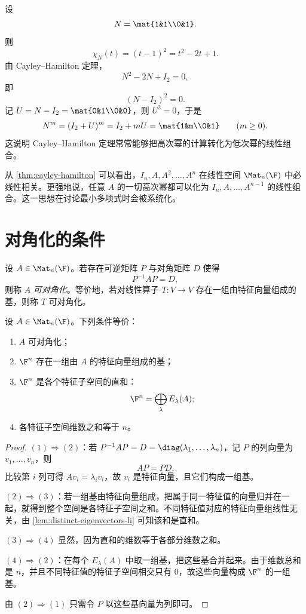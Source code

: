 \begin{example}
设
\[
N=\mat{1&1\\0&1}.
\]
则
\[
\chi_N(t)=(t-1)^2=t^2-2t+1.
\]
由 Cayley--Hamilton 定理，
\[
N^2-2N+I_2=0,
\]
即
\[
(N-I_2)^2=0.
\]
记 \(U=N-I_2=\mat{0&1\\0&0}\)，则 \(U^2=0\)，于是
\[
N^m=(I_2+U)^m=I_2+mU=\mat{1&m\\0&1}
\qquad (m\ge 0).
\]
这说明 Cayley--Hamilton 定理常常能够把高次幂的计算转化为低次幂的线性组合。
\end{example}

\begin{remark}
从 \cref{thm:cayley-hamilton} 可以看出，\(I_n,A,A^2,\dots,A^n\) 在线性空间 \(\Mat_n(\F)\) 中必线性相关。更强地说，任意 \(A\) 的一切高次幂都可以化为 \(I_n,A,\dots,A^{n-1}\) 的线性组合。这一思想在讨论最小多项式时会被系统化。
\end{remark}

\section{对角化的条件}\label{sec:diagonalization}

\begin{definition}
设 \(A\in \Mat_n(\F)\)。若存在可逆矩阵 \(P\) 与对角矩阵 \(D\) 使得
\[
P^{-1}AP=D,
\]
则称 \(A\) \emph{可对角化}。等价地，若对线性算子 \(T\colon V\to V\) 存在一组由特征向量组成的基，则称 \(T\) 可对角化。
\end{definition}

\begin{theorem}\label{thm:diag-criterion-basis}
设 \(A\in \Mat_n(\F)\)。下列条件等价：
\begin{enumerate}[label=(\arabic*), leftmargin=2.4em]
  \item \(A\) 可对角化；
  \item \(\F^n\) 存在一组由 \(A\) 的特征向量组成的基；
  \item \(\F^n\) 是各个特征子空间的直和：
  \[
  \F^n=\bigoplus_{\lambda} E_\lambda(A);
  \]
  \item 各特征子空间维数之和等于 \(n\)。
\end{enumerate}
\end{theorem}

\begin{proof}
\((1)\Rightarrow(2)\)：若 \(P^{-1}AP=D=\diag(\lambda_1,\dots,\lambda_n)\)，记 \(P\) 的列向量为 \(v_1,\dots,v_n\)，则
\[
AP=PD.
\]
比较第 \(i\) 列可得 \(Av_i=\lambda_iv_i\)，故 \(v_i\) 是特征向量，且它们构成一组基。

\((2)\Rightarrow(3)\)：若一组基由特征向量组成，把属于同一特征值的向量归并在一起，就得到整个空间是各特征子空间之和。不同特征值对应的特征向量组线性无关，由 \cref{lem:distinct-eigenvectors-li} 可知该和是直和。

\((3)\Rightarrow(4)\) 显然，因为直和的维数等于各部分维数之和。

\((4)\Rightarrow(2)\)：在每个 \(E_\lambda(A)\) 中取一组基，把这些基合并起来。由于维数总和是 \(n\)，并且不同特征值的特征子空间相交只有 \(0\)，故这些向量构成 \(\F^n\) 的一组基。

由 \((2)\Rightarrow(1)\) 只需令 \(P\) 以这些基向量为列即可。
\end{proof}

